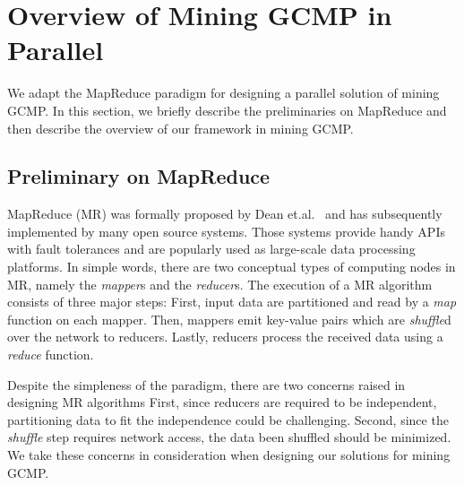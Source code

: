 \section{Overview of Mining GCMP in Parallel}
\label{sec:system_overview}
We adapt the MapReduce paradigm for designing
a parallel solution of mining GCMP. In this section,
we briefly describe the preliminaries on MapReduce and then describe
the overview of our framework in mining GCMP.

\subsection{Preliminary on MapReduce}
MapReduce (MR) was formally proposed by Dean et.al.~\cite{dean2008mapreduce}
and has subsequently implemented by many open source systems. Those systems
provide handy APIs with fault tolerances and are popularly
used as large-scale data processing platforms. 
In simple words, there are two conceptual types of computing nodes in MR,
namely the \emph{mapper}s and the \emph{reducer}s. The execution of a MR 
algorithm consists of three major steps: First, input data
are partitioned and read by a \emph{map} function on each mapper. Then, mappers
emit key-value pairs which are \emph{shuffle}d over the network to reducers. Lastly,
reducers process the received data using a \emph{reduce} function. 

Despite the simpleness of the paradigm, there are two concerns raised in designing MR algorithms
First, since reducers are required to be independent, partitioning  
data to fit the independence could be challenging. Second, since the \emph{shuffle}
step requires network access, the data been shuffled should be minimized. 
We take these concerns in consideration when designing our solutions for mining GCMP.
%
%

